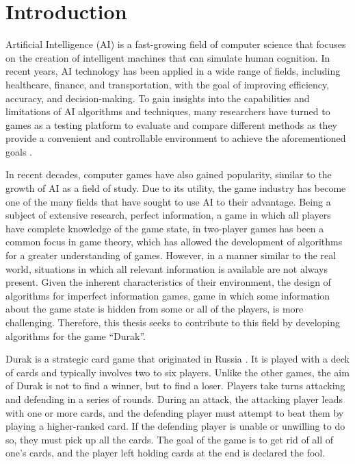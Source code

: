 \chapter*{Introduction}

Artificial Intelligence (AI) is a fast-growing field of computer science that focuses on the creation of intelligent machines that can simulate human cognition. In recent years, AI technology has been applied in a wide range of fields, including healthcare, finance, and transportation, with the goal of improving efficiency, accuracy, and decision-making. To gain insights into the capabilities and limitations of AI algorithms and techniques, many researchers have turned to games as a testing platform to evaluate and compare different methods as they provide a convenient and controllable environment to achieve the aforementioned goals \citep{yannakakis_togelius_2018}. 

In recent decades, computer games have also gained popularity, similar to the growth of AI as a field of study. Due to its utility, the game industry has become one of the many fields that have sought to use AI to their advantage. Being a subject of extensive research, perfect information, a game in which all players have complete knowledge of the game state, in two-player games has been a common focus in game theory, which has allowed the development of algorithms for a greater understanding of games. However, in a manner similar to the real world, situations in which all relevant information is available are not always present. Given the inherent characteristics of their environment, the design of algorithms for imperfect information games, game in which some information about the game state is hidden from some or all of the players, is more challenging. Therefore, this thesis seeks to contribute to this field by developing algorithms for the game ``Durak''.

Durak is a strategic card game that originated in Russia \citep*{website:PAGAT_DURAK}. It is played with a deck of cards and typically involves two to six players. Unlike the other games, the aim of Durak is not to find a winner, but to find a loser. Players take turns attacking and defending in a series of rounds. During an attack, the attacking player leads with one or more cards, and the defending player must attempt to beat them by playing a higher-ranked card. If the defending player is unable or unwilling to do so, they must pick up all the cards. The goal of the game is to get rid of all of one's cards, and the player left holding cards at the end is declared the fool. 

